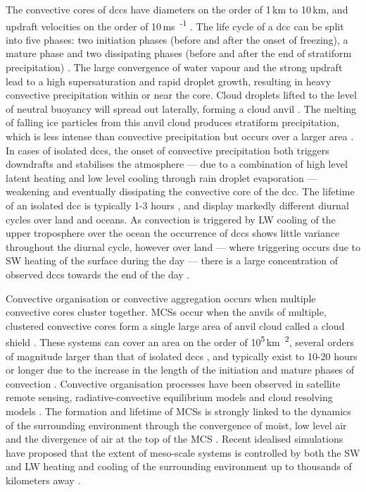 The convective cores of \acrshort{dcc}s have diameters on the order of 1\,\unit{km} to 10\,\unit{km}, and updraft velocities on the order of 10\,\unit{ms\textsuperscript{-1}} \citep{weisman_mesoscale_2015}.
The life cycle of a \acrshort{dcc} can be split into five phases: two initiation phases (before and after the onset of freezing), a mature phase and two dissipating phases (before and after the end of stratiform precipitation) \citep{wall_life_2018}.
The large convergence of water vapour and the strong updraft lead to a high supersaturation and rapid droplet growth, resulting in heavy convective precipitation within or near the core.
Cloud droplets lifted to the level of neutral buoyancy will spread out laterally, forming a cloud anvil \citep{houze_chapter_2014}. 
The melting of falling ice particles from this anvil cloud produces stratiform precipitation, which is less intense than convective precipitation but occurs over a larger area \citep{houze_stratiform_1997}.
In cases of isolated \acrshort{dcc}s, the onset of convective precipitation both triggers downdrafts and stabilises the atmosphere --- due to a combination of high level latent heating and low level cooling through rain droplet evaporation --- weakening and eventually dissipating the convective core of the \acrshort{dcc}.
The lifetime of an isolated \acrshort{dcc} is typically 1-3 hours \citep{chen_diurnal_1997}, and display markedly different diurnal cycles over land and oceans. 
As convection is triggered by LW cooling of the upper troposphere over the ocean the occurrence of \acrshort{dcc}s shows little variance throughout the diurnal cycle, however over land --- where triggering occurs due to SW heating of the surface during the day --- there is a large concentration of observed \acrshort{dcc}s towards the end of the day \citep{taylor_evaluating_2017}.

Convective organisation or convective aggregation occurs when multiple convective cores cluster together. MCSs occur when the anvils of multiple, clustered convective cores form a single large area of anvil cloud called a cloud shield \citep{roca_simple_2017}. 
These systems can cover an area on the order of 10\textsuperscript{5}\,\unit{km\textsuperscript{2}}, several orders of magnitude larger than that of isolated \acrshort{dcc}s \citep{houze_mesoscale_2004}, and typically exist to 10-20 hours or longer \citep{chen_diurnal_1997} due to the increase in the length of the initiation and mature phases of convection \citep{wall_life_2018}.
Convective organisation processes have been observed in satellite remote sensing, radiative-convective equilibrium models and cloud resolving models \citep{holloway_observing_2017}. 
The formation and lifetime of MCSs is strongly linked to the dynamics of the surrounding environment through the convergence of moist, low level air and the divergence of air at the top of the MCS \citep{houze_chapter_2014}. 
Recent idealised simulations have proposed that the extent of meso-scale systems is controlled by both the SW and LW heating and cooling of the surrounding environment up to thousands of kilometers away \citep{beucler_budget_2019}. 


